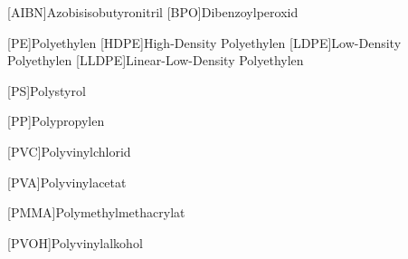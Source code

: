 \begin{acronym}
    [AIBN]{Azobisisobutyronitril}
    [BPO]{Dibenzoylperoxid}
    
    [PE]{Polyethylen}
    [HDPE]{High-Density Polyethylen}
    [LDPE]{Low-Density Polyethylen}
    [LLDPE]{Linear-Low-Density Polyethylen}
    
    [PS]{Polystyrol}
    
    [PP]{Polypropylen}
    
    [PVC]{Polyvinylchlorid}
    
    [PVA]{Polyvinylacetat}
    
    [PMMA]{Polymethylmethacrylat}
    
    [PVOH]{Polyvinylalkohol}
\end{acronym}